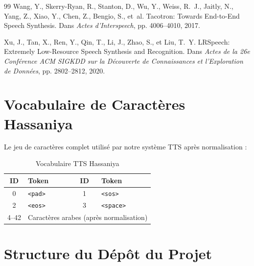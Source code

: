 \documentclass[12pt,a4paper]{article}
\begin{document}
\begin{thebibliography}{99}
Wang, Y., Skerry-Ryan, R., Stanton, D., Wu, Y., Weiss, R.~J., Jaitly, N., Yang, Z., Xiao, Y., Chen, Z., Bengio, S., et~al.
\newblock Tacotron: Towards End-to-End Speech Synthesis.
\newblock Dans \emph{Actes d'Interspeech}, pp. 4006--4010, 2017.

Xu, J., Tan, X., Ren, Y., Qin, T., Li, J., Zhao, S., et Liu, T.~Y.
\newblock LRSpeech: Extremely Low-Resource Speech Synthesis and Recognition.
\newblock Dans \emph{Actes de la 26e Conférence ACM SIGKDD sur la Découverte de Connaissances et l'Exploration de Données}, pp. 2802--2812, 2020.

\end{thebibliography}

\newpage
\appendix

\section{Vocabulaire de Caractères Hassaniya}
\label{app:vocab}

Le jeu de caractères complet utilisé par notre système TTS après normalisation :

\begin{table}[H]
\centering
\caption{Vocabulaire TTS Hassaniya}
\begin{tabular}{clcl}
\toprule
\textbf{ID} & \textbf{Token} & \textbf{ID} & \textbf{Token} \\
\midrule
0 & \texttt{<pad>} & 1 & \texttt{<sos>} \\
2 & \texttt{<eos>} & 3 & \texttt{<space>} \\
4--42 & \multicolumn{3}{l}{Caractères arabes (après normalisation)} \\
\bottomrule
\end{tabular}
\end{table}

\section{Structure du Dépôt du Projet}
\label{app:repo}
\end{document}
